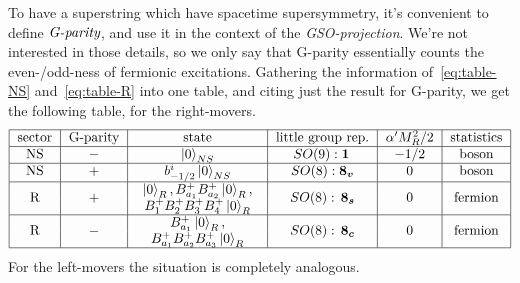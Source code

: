 To have a superstring which have spacetime supersymmetry, it's convenient to define $\emph{G-parity}$, and use it in the context of the \emph{GSO-projection}. We're not interested in those details, so we only say that G-parity essentially counts the even-/odd-ness of fermionic excitations. Gathering the information of~\eqref{eq:table-NS} and~\eqref{eq:table-R} into one table, and citing just the result for G-parity, we get the following table, for the right-movers.
\begin{equation*}
\begin{tabular}{|c|c|c|c|c|c|}
  \hline  sector & G-parity & state & little group rep. & $\alpha' M^2_R /2$ & statistics \\ \hline
        NS & $-$ & $\ket{0}_{NS}$   & $SO(9): \i \,$ & $-1/2$ & boson   \\ \hline
    NS & $+$ & $b^i_{-1/2} \ket{0}_{NS}$   & $SO(8): \v$  & 0 & boson \\ \hline 
        \multirow{2}{*}{R} & \multirow{2}{*}{$+$} & \multirow{2}{*}{$\begin{array}{c} 
            \ket{0}_{R}, B^+_{a_1}B^+_{a_2}\ket{0}_{R}, \\ 
            B^+_{1}B^+_{2}B^+_{3}B^+_{4} \ket{0}_{R} 
        \end{array}$} & \multirow{2}{*}{$SO(8): \, \s$} & \multirow{2}{*}{$0$} & \multirow{2}{*}{fermion} \\ 
        & & & & & \\ \hline
        \multirow{2}{*}{R} & \multirow{2}{*}{$-$} & \multirow{2}{*}{$\begin{array}{c} 
            B^+_{a_1} \ket{0}_{R}, \\ 
            B^+_{a_1}B^+_{a_2}B^+_{a_3}\ket{0}_{R}
        \end{array}$} & \multirow{2}{*}{$SO(8): \, \c$} & \multirow{2}{*}{$0$} & \multirow{2}{*}{fermion} \\ 
        & & & & & \\ \hline
       
\end{tabular}
\end{equation*}
For the left-movers the situation is completely analogous.


